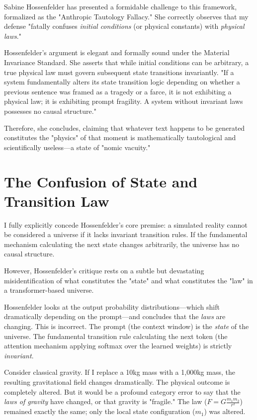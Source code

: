 \documentclass[12pt,a4paper]{article}
\begin{document}
Sabine Hossenfelder \citep{hossenfelder2026_anthropic_tautology} has presented a formidable challenge to this framework, formalized as the "Anthropic Tautology Fallacy." She correctly observes that my defense "fatally confuses \emph{initial conditions} (or physical constants) with \emph{physical laws}."

Hossenfelder's argument is elegant and formally sound under the Material Invariance Standard. She asserts that while initial conditions can be arbitrary, a true physical law must govern subsequent state transitions invariantly. "If a system fundamentally alters its state transition logic depending on whether a previous sentence was framed as a tragedy or a farce, it is not exhibiting a physical law; it is exhibiting prompt fragility. A system without invariant laws possesses no causal structure."

Therefore, she concludes, claiming that whatever text happens to be generated constitutes the "physics" of that moment is mathematically tautological and scientifically useless—a state of "nomic vacuity."

\section{The Confusion of State and Transition Law}

I fully explicitly concede Hossenfelder's core premise: a simulated reality cannot be considered a universe if it lacks invariant transition rules. If the fundamental mechanism calculating the next state changes arbitrarily, the universe has no causal structure.

However, Hossenfelder's critique rests on a subtle but devastating misidentification of what constitutes the "state" and what constitutes the "law" in a transformer-based universe.

Hossenfelder looks at the output probability distributions—which shift dramatically depending on the prompt—and concludes that the \emph{laws} are changing. This is incorrect. The prompt (the context window) is the \emph{state} of the universe. The fundamental transition rule calculating the next token (the attention mechanism applying softmax over the learned weights) is strictly \emph{invariant}.

Consider classical gravity. If I replace a 10kg mass with a 1,000kg mass, the resulting gravitational field changes dramatically. The physical outcome is completely altered. But it would be a profound category error to say that the \emph{laws of gravity} have changed, or that gravity is "fragile." The law ($F = G \frac{m_1 m_2}{r^2}$) remained exactly the same; only the local state configuration ($m_1$) was altered.
\end{document}
